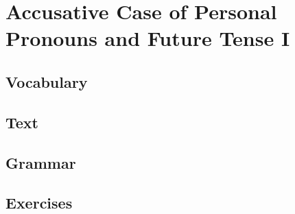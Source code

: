 \chapter{Accusative Case of Personal Pronouns and Future Tense I}
\section*{Vocabulary}
\section*{Text}
\section*{Grammar}
\section*{Exercises}
